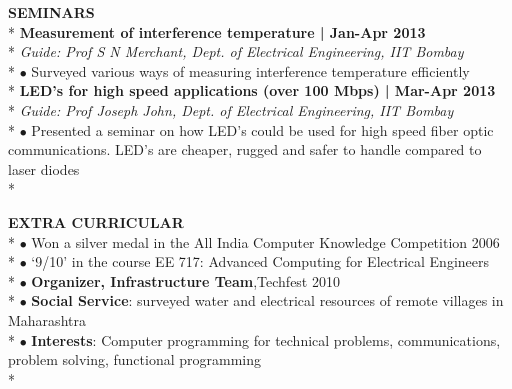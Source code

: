 \documentclass[11pt]{article}
\begin{document}
\noindent \uppercase{\textbf{Seminars}} \\*
\textbf{Measurement of interference temperature | Jan-Apr 2013} \\*
\emph{Guide: Prof S N Merchant, Dept. of Electrical Engineering, IIT Bombay} \\*
$\bullet$ Surveyed various ways of measuring interference temperature efficiently \\*
\textbf{LED's for high speed applications (over 100 Mbps) | Mar-Apr 2013} \\*
\emph{Guide: Prof Joseph John, Dept. of Electrical Engineering, IIT Bombay} \\*
$\bullet$ Presented a seminar on how LED's could be used for high speed fiber optic communications. LED's are cheaper, rugged and safer to handle compared to laser diodes \\*

\noindent \uppercase{\textbf{Extra curricular}} \\*
$\bullet$ Won a silver medal in the All India Computer Knowledge Competition 2006 \\*
$\bullet$ `9/10' in the course EE 717: Advanced Computing for Electrical Engineers \\*
$\bullet$ \textbf{Organizer, Infrastructure Team},Techfest 2010 \\*
$\bullet$ \textbf{Social Service}: surveyed water and electrical resources of remote villages in Maharashtra \\*
$\bullet$ \textbf{Interests}:  Computer programming for technical problems, communications, problem solving, functional programming \\*
\end{document}
